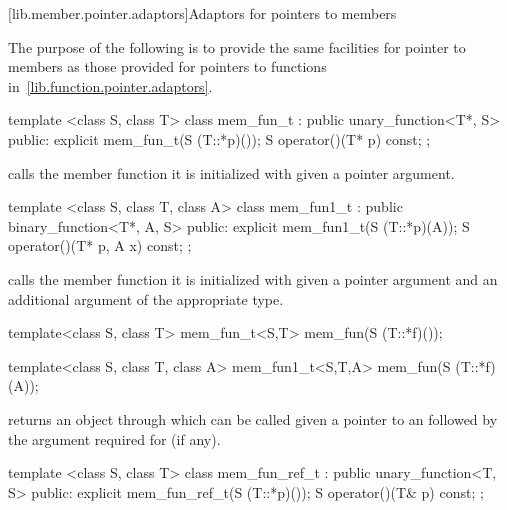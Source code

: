 [lib.member.pointer.adaptors]{Adaptors for pointers to members}

\pnum
The purpose of the following is to provide the same facilities for pointer to
members as those provided for pointers to functions
in~\ref{lib.function.pointer.adaptors}.

%
\begin{itemdecl}
template <class S, class T> class mem_fun_t
        : public unary_function<T*, S> {
public:
  explicit mem_fun_t(S (T::*p)());
  S operator()(T* p) const;
};
\end{itemdecl}

\begin{itemdescr}
\pnum
{} calls the member function it is initialized with given a pointer
argument.
\end{itemdescr}

%
\begin{itemdecl}
  template <class S, class T, class A> class mem_fun1_t
        : public binary_function<T*, A, S> {
  public:
    explicit mem_fun1_t(S (T::*p)(A));
    S operator()(T* p, A x) const;
};
\end{itemdecl}

\begin{itemdescr}
\pnum
{} calls the member function it is initialized with given
a pointer argument and an additional argument of the appropriate type.
\end{itemdescr}

%
\begin{itemdecl}
  template<class S, class T> mem_fun_t<S,T>
     mem_fun(S (T::*f)());

  template<class S, class T, class A> mem_fun1_t<S,T,A>
     mem_fun(S (T::*f)(A));
\end{itemdecl}

\begin{itemdescr}
\pnum
{} returns an object through which  can be
called given a pointer to an  followed by the argument required for
 (if any).
\end{itemdescr}

%
\begin{itemdecl}
  template <class S, class T> class mem_fun_ref_t
        : public unary_function<T, S> {
  public:
    explicit mem_fun_ref_t(S (T::*p)());
    S operator()(T& p) const;
};
\end{itemdecl}

